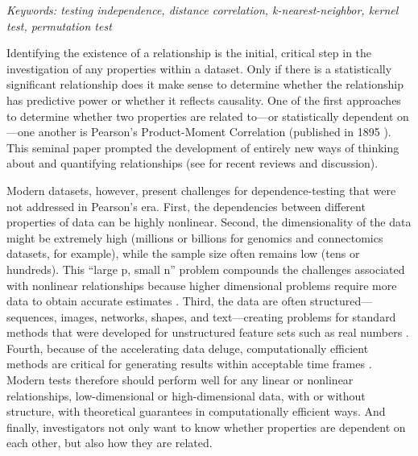 \documentclass[11pt]{article}
\begin{document}
\noindent%
{\it Keywords: testing independence, distance correlation, k-nearest-neighbor, kernel test, permutation test}

\clearpage
\setcounter{tocdepth}{2}


Identifying the existence of a relationship is the initial, critical step in the investigation of any properties within a dataset. Only if there is a statistically significant relationship does it make sense to determine whether the relationship has predictive power or whether it reflects causality.
One of the first approaches to determine whether two properties are related to---or statistically dependent on---one another is Pearson's Product-Moment Correlation (published in 1895 \cite{Pearson1895}). This seminal paper prompted the development of  entirely new ways of thinking about and quantifying relationships (see \cite{Reimherr2013,JosseHolmes2013} for  recent reviews and discussion).


Modern datasets, however, present  challenges for dependence-testing that were not addressed in Pearson's era.
%
First, the dependencies between different properties 
of data can be highly {nonlinear}.
% 
Second, the dimensionality of the data might be extremely high (millions or billions for genomics and connectomics datasets, for example), while the sample size often remains low (tens or hundreds).  This ``{large p, small n}'' problem compounds the challenges associated with nonlinear relationships because higher dimensional problems require more data to obtain accurate estimates \cite{johnstone2009statistical}.
Third, the data are often {structured}---sequences, images, networks, shapes, and text---creating problems for standard methods that were developed for unstructured feature sets such as real numbers \cite{bakir2007predicting}.
Fourth, because of the accelerating data deluge,  {computationally efficient} methods are critical for generating results within acceptable time frames \cite{hey2009fourth}.
Modern tests therefore should perform well for any linear or nonlinear relationships, low-dimensional or high-dimensional data, with or without structure, with theoretical guarantees in computationally efficient ways.
And finally, investigators not only want to know {whether}  properties are dependent on each other, but also {how they are related.}
\end{document}
